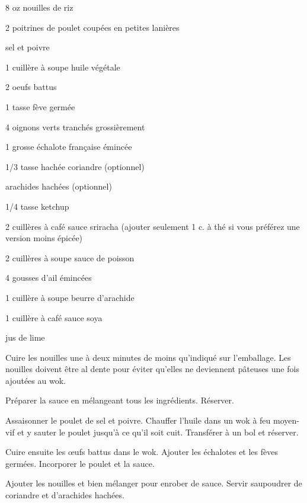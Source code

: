 


\totaltime{}


\begin{ingredients}
    \item 8 oz nouilles de riz
    \item 2 poitrines de poulet coupées en petites lanières
    \item sel et poivre
    \item 1 cuillère à soupe huile végétale
    \item 2 oeufs battus
    \item 1 tasse fève germée
    \item 4 oignons verts tranchés grossièrement
    \item 1 grosse échalote française émincée
    \item 1/3 tasse hachée coriandre (optionnel)
    \item arachides hachées (optionnel)
    \item 1/4 tasse ketchup
    \item 2 cuillères à café sauce sriracha (ajouter seulement 1 c. à thé si vous préférez une version moins épicée)
    \item 2 cuillères à soupe sauce de poisson
    \item 4 gousses d'ail émincées
    \item 1 cuillère à soupe beurre d'arachide
    \item 1 cuillère à café sauce soya
    \item jus de lime
\end{ingredients}

\begin{steps}
    \item Cuire les nouilles une à deux minutes de moins qu’indiqué sur l'emballage. Les nouilles doivent être al dente pour éviter qu’elles ne deviennent pâteuses une fois ajoutées au wok.
    \item Préparer la sauce en mélangeant tous les ingrédients. Réserver.
    \item Assaisonner le poulet de sel et poivre. Chauffer l’huile dans un wok à feu moyen-vif et y sauter le poulet jusqu’à ce qu’il soit cuit. Transférer à un bol et réserver.
    \item Cuire ensuite les œufs battus dans le wok. Ajouter les échalotes et les fèves germées. Incorporer le poulet et la sauce.
    \item Ajouter les nouilles et bien mélanger pour enrober de sauce. Servir saupoudrer de coriandre et d’arachides hachées.
\end{steps}
